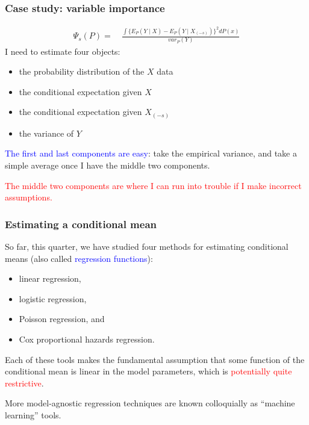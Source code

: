 \documentclass[12pt, 
hyperref={colorlinks=true, linkcolor=blue, urlcolor=cyan},dvipsnames]{beamer}
\begin{document}
\begin{frame}
\frametitle{Case study: variable importance}
\vspace{-0.75cm}
\begin{align*}
\Psi_s(P) = &\ \frac{\int \{E_P(Y \mid X) - E_P(Y \mid X_{(-s)})\}^2 dP(x)}{var_P(Y)}
\end{align*}
\vspace{-0.4cm}
I need to estimate four objects:
\begin{itemize}
\item the probability distribution of the $X$ data
\item the conditional expectation given $X$
\item the conditional expectation given $X_{(-s)}$
\item the variance of $Y$
\end{itemize}

\textcolor{blue}{The first and last components are easy}: take the empirical variance, and take a simple average once I have the middle two components.

\textcolor{red}{The middle two components are where I can run into trouble if I make incorrect assumptions. }
\end{frame}

\begin{frame}
\frametitle{Estimating a conditional mean}
So far, this quarter, we have studied four methods for estimating conditional means (also called \textcolor{blue}{regression functions}):
\begin{itemize}
\item linear regression,
\item logistic regression, 
\item Poisson regression, and
\item Cox proportional hazards regression.
\end{itemize}

Each of these tools makes the fundamental assumption that some function of the conditional mean is linear in the model parameters, which is \textcolor{red}{potentially quite restrictive}. 

More model-agnostic regression techniques are known colloquially as ``machine learning'' tools.
\end{frame}
\end{document}
